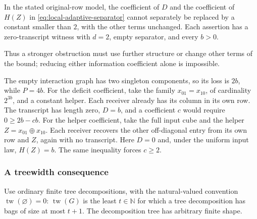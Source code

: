 \begin{theorem}\label{thm:local-separator-sharpness}
In the stated original-row model, the coefficient of $D$ and the coefficient
of $H(Z)$ in \eqref{eq:local-adaptive-separator} cannot separately be replaced
by a constant smaller than $2$, with the other terms unchanged.  Each assertion
has a zero-transcript witness with $d=2$, empty separator, and every $b>0$.
\end{theorem}
Thus a stronger obstruction must use further structure or change other terms
of the bound; reducing either information coefficient alone is impossible.
\begin{proofoutline}
The empty interaction graph has two singleton components, so its loss is
$2b$, while $P=4b$.  For the deficit coefficient, take the family
$x_{01}=x_{10}$, of cardinality $2^{3b}$, and a constant helper.  Each receiver
already has its column in its own row.  The transcript has length zero,
$D=b$, and a coefficient $c$ would require $0\ge 2b-cb$.
For the helper coefficient, take the full input cube and the helper
$Z=x_{01}\oplus x_{10}$.  Each receiver recovers the other off-diagonal
entry from its own row and $Z$, again with no transcript.  Here $D=0$ and,
under the uniform input law, $H(Z)=b$.  The same inequality forces $c\ge2$.
\end{proofoutline}

\subsubsection{A treewidth consequence}

Use ordinary finite tree decompositions, with the natural-valued convention
$\operatorname{tw}(\varnothing)=0$: $\operatorname{tw}(G)$ is the least
$t\in\mathbb N$ for which a tree decomposition has bags of size at most
$t+1$.  The decomposition tree has arbitrary finite shape.

